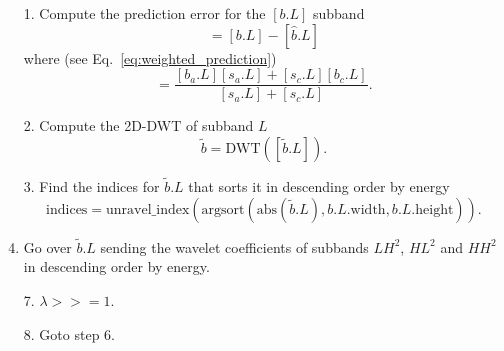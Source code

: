 \begin{enumerate}
\item [1.] Compute the prediction error for the $[b.L]$ subband
\begin{equation}
  [\tilde{b}.L] = [b.L] - [\hat{b}.L]
\end{equation}
where (see Eq.~\ref{eq:weighted_prediction})
\begin{equation}
  [\hat{b}.L] = \frac{[b_a.L][s_a.L]+[s_c.L][b_c.L]}{[s_a.L]+[s_c.L]}.
\end{equation}

\item [2.] Compute the 2D-DWT of subband $L$
  \begin{equation}
    \tilde{b}=\text{DWT}([\tilde{b}.L]).
  \end{equation}

\item [3.] Find the indices for $\tilde{b}.L$ that sorts it in descending order by energy
  \begin{equation}
    \text{indices}=\text{unravel\_index}(\text{argsort}(\text{abs}(\tilde{b}.L),
    b.L.\text{width}, b.L.\text{height})).
  \end{equation}
\item Go over $\tilde{b}.L$ sending the wavelet coefficients of subbands
  $LH^2$, $HL^2$ and $HH^2$ in descending order by energy.
\item [7.] $\lambda >>= 1$.
\item [8.] Goto step 6.
\end{enumerate}

